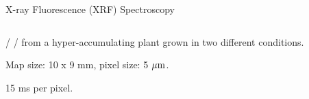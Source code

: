 \begin{slide} {X-ray Fluorescence (XRF) Spectroscopy}
\begin{cenpage}{140mm}
\begin{columns}[T]
\begin{column}{69mm}
      {} / {} / {} from a
      hyper-accumulating plant grown in two different conditions.

      \vmm

      Map size: 10 x 9 mm,  pixel size: 5 $\rm{\mu}m$.

      15 ms per pixel.

      \vspace{10mm}
      \vfill
    \end{column}
    \end{columns}
    


\end{cenpage}

\end{slide}






